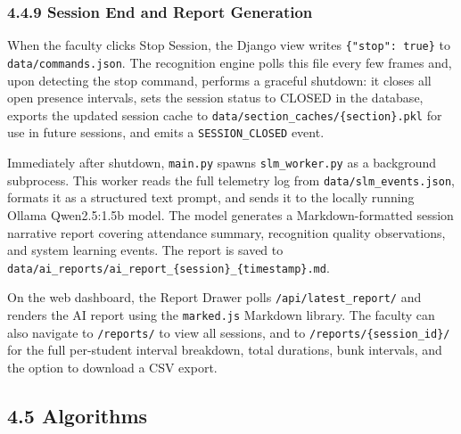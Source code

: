 \documentclass{report}
\begin{document}
\subsubsection*{4.4.9 Session End and Report Generation}
\normalsize{
When the faculty clicks Stop Session, the Django view writes \texttt{\{"stop": true\}} to\vspace{3pt} \texttt{data/commands.json}. The recognition engine polls this file every few frames and, upon detecting\vspace{3pt} the stop command, performs a graceful shutdown: it closes all open presence intervals, sets the session\vspace{3pt} status to CLOSED in the database, exports the updated session cache to\vspace{3pt} \texttt{data/section\_caches/\{section\}.pkl} for use in future sessions, and emits a\vspace{3pt} \texttt{SESSION\_CLOSED} event.

Immediately after shutdown, \texttt{main.py} spawns \texttt{slm\_worker.py} as a background subprocess.\vspace{3pt} This worker reads the full telemetry log from \texttt{data/slm\_events.json}, formats it as a structured\vspace{3pt} text prompt, and sends it to the locally running Ollama Qwen2.5:1.5b model. The model generates\vspace{3pt} a Markdown-formatted session narrative report covering attendance summary, recognition quality\vspace{3pt} observations, and system learning events. The report is saved to\vspace{3pt} \texttt{data/ai\_reports/ai\_report\_\{session\}\_\{timestamp\}.md}.

On the web dashboard, the Report Drawer polls \texttt{/api/latest\_report/} and renders the AI report\vspace{3pt} using the \texttt{marked.js} Markdown library. The faculty can also navigate to \texttt{/reports/} to view all\vspace{3pt} sessions, and to \texttt{/reports/\{session\_id\}/} for the full per-student interval breakdown, total durations,\vspace{3pt} bunk intervals, and the option to download a CSV export.
}

\subsection*{4.5 Algorithms}
\end{document}
